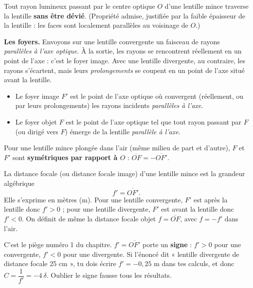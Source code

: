 \documentclass[11pt]{article}
\newcommand{\cle}[1]{{\popxbold\color{popdark}#1}}
\begin{document}
\begin{propriete}
Tout rayon lumineux passant par le \cle{centre optique} $O$ d'une lentille mince traverse la lentille \textbf{sans être dévié}. (Propriété admise, justifiée par la faible épaisseur de la lentille : les faces sont localement parallèles au voisinage de $O$.)
\end{propriete}

\textbf{Les foyers.} Envoyons sur une lentille convergente un faisceau de rayons \emph{parallèles à l'axe optique}. À la sortie, les rayons se rencontrent réellement en un point de l'axe : c'est le foyer image. Avec une lentille divergente, au contraire, les rayons s'écartent, mais leurs \emph{prolongements} se coupent en un point de l'axe situé avant la lentille.

\begin{definition}
\begin{itemize}
\item Le \cle{foyer image} $F'$ est le point de l'axe optique où convergent (réellement, ou par leurs prolongements) les rayons incidents \emph{parallèles à l'axe}.
\item Le \cle{foyer objet} $F$ est le point de l'axe optique tel que tout rayon passant par $F$ (ou dirigé vers $F$) émerge de la lentille \emph{parallèle à l'axe}.
\end{itemize}
Pour une lentille mince plongée dans l'air (même milieu de part et d'autre), $F$ et $F'$ sont \textbf{symétriques par rapport à $O$} : $\overline{OF} = -\overline{OF'}$.
\end{definition}

\begin{definition}
La \cle{distance focale} (ou distance focale image) d'une lentille mince est la grandeur algébrique
\[ f' = \overline{OF'}. \]
Elle s'exprime en mètres (m). Pour une lentille convergente, $F'$ est après la lentille donc $f' > 0$ ; pour une lentille divergente, $F'$ est avant la lentille donc $f' < 0$. On définit de même la distance focale objet $f = \overline{OF}$, avec $f = -f'$ dans l'air.
\end{definition}

\begin{attention}
C'est le piège numéro 1 du chapitre. $f' = \overline{OF'}$ porte un \textbf{signe} : $f' > 0$ pour une convergente, $f' < 0$ pour une divergente. Si l'énoncé dit « lentille divergente de distance focale 25 cm », tu dois écrire $f' = -0{,}25$ m dans tes calculs, et donc $C = \dfrac{1}{f'} = -4\ \delta$. Oublier le signe fausse tous les résultats.
\end{attention}
\end{document}
